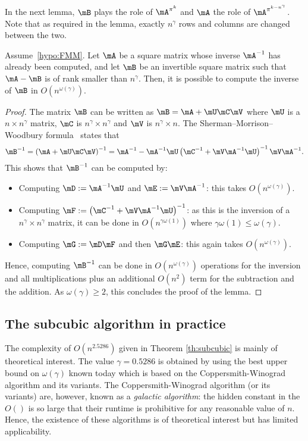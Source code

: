 In the next lemma, $\mB$ plays the role of $\mA^{\pi^k}$ and $\mA$ the role of $\mA^{\pi^{k- n^{\gamma} }}$. Note that as required in the lemma, exactly $ n^\gamma $ rows and columns are changed between the two.
\begin{lem}
    \label{lem:woodbury}
    Assume~\ref{hypo:FMM}. Let $\mA$ be a square matrix whose inverse $\mA^{-1}$ has already been computed, and let $\mB$ be an invertible square matrix such that $\mA-\mB$ is of rank smaller than $ n^{\gamma} $. Then, it is possible to compute the inverse of $\mB$ in $O(n^{\omega(\gamma)})$. 
\end{lem}
\begin{proof}
    The matrix $\mB$ can be written as $\mB=\mA + \mU\mC\mV$ where $\mU$ is a $n\times n^\gamma $ matrix, $\mC$ is $ n^\gamma \times n^\gamma $ and $\mV$ is $ n^\gamma \times n$. The Sherman–Morrison–Woodbury formula~\cite{woodbury1950inverting} states that
    \begin{align*}
        \mB^{-1} = \left(\mA + \mU\mC\mV \right)^{-1} = \mA^{-1} - \mA^{-1}\mU \left(\mC^{-1} + \mV\mA^{-1}\mU \right)^{-1} \mV\mA^{-1}.
    \end{align*}
    This shows that $\mB^{-1}$ can be computed by:
    \begin{itemize}
        \item Computing $\mD:=\mA^{-1}\mU$ and $\mE:=\mV\mA^{-1}$: this takes $O(n^{\omega(\gamma)})$. 
        \item Computing $\mF:=\left(\mC^{-1} + \mV\mA^{-1}\mU \right)^{-1}$: as this is the inversion of a $ n^\gamma \times n^\gamma $ matrix, it can be done in $O(n^{\gamma\omega(1)})$ where $\gamma\omega(1)\le \omega(\gamma)$.
        \item Computing $\mG:=\mD\mF$ and then $\mG\mE$: this again takes $O(n^{\omega(\gamma)})$. 
    \end{itemize}
    Hence, computing $\mB^{-1}$ can be done in $O(n^{\omega(\gamma)})$ operations for the inversion and all   multiplications plus an additional $O(n^2)$ term for the subtraction and the addition. As $\omega(\gamma)\ge2$, this concludes the proof of the lemma.
\end{proof}

\subsection{The subcubic algorithm in practice}

The complexity of $O(n^{2.5286})$ given in Theorem \ref{th:subcubic} is mainly of theoretical interest. The value $\gamma = 0.5286$ is obtained by using the best upper bound  on $\omega(\gamma)$ known today which is based on the Coppersmith-Winograd algorithm and its variants. The Coppersmith-Winograd algorithm (or its variants) are, however, known as a \emph{galactic algorithm}: the hidden constant in the $O()$ is so large that their runtime is prohibitive for any reasonable value of $n$. Hence, the existence of these algorithms is of theoretical interest but has limited applicability.

